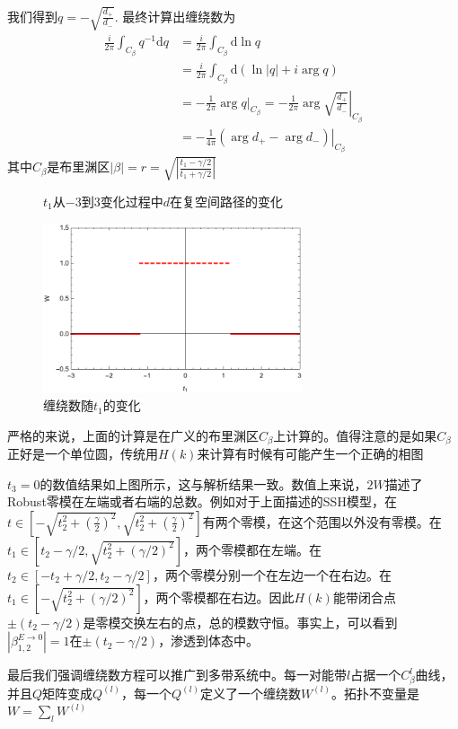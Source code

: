 \documentclass{article}
\begin{document}
我们得到$q=-\sqrt{\frac{d_+}{d_-}}$. 最终计算出缠绕数为
\begin{equation}
    \begin{split}
        \frac{i}{2\pi}\int_{C_\beta}q^{-1}\mathrm{d}q&=\frac{i}{2\pi}\int_{C_\beta}\mathrm{d}\ln q\\
        &=\frac{i}{2\pi}\int_{C_\beta}\mathrm{d}\left(\ln |q|+i\arg q\right)\\
        &=-\frac{1}{2\pi}\arg q|_{C_\beta}=\left.-\frac{1}{2\pi}\arg\sqrt{\frac{d_+}{d_-}}\right|_{C_\beta}\\
        &=\left.-\frac{1}{4\pi}(\arg d_+-\arg d_-)\right|_{C_\beta}
    \end{split}
\end{equation}
其中$C_\beta$是布里渊区$|\beta|=r=\sqrt{|\frac{t_1-\gamma/2}{t_1+\gamma/2}|}$
\begin{figure}[h]
    \centering
    \caption{$t_1$从$-3$到$3$变化过程中$d$在复空间路径的变化}
\end{figure}
\begin{figure}[h]
    \centering
    \includegraphics[width=3in]{windingnumber.pdf}
    \caption{缠绕数随$t_1$的变化}
\end{figure}
严格的来说，上面的计算是在广义的布里渊区$C_\beta$上计算的。值得注意的是如果$C_\beta$正好是一个单位圆，传统用$H(k)$来计算有时候有可能产生一个正确的相图

$t_3=0$的数值结果如上图所示，这与解析结果一致。数值上来说，$2W$描述了Robust零模在左端或者右端的总数。例如对于上面描述的SSH模型，在$t\in[-\sqrt{t_2^2+(\frac{\gamma}{2})^2},\sqrt{t_2^2+(\frac{\gamma}{2})^2}]$有两个零模，在这个范围以外没有零模。在$t_1\in[t_2-\gamma/2,\sqrt{t_2^2+(\gamma/2)^2}]$，两个零模都在左端。在$t_2\in[-t_2+\gamma/2,t_2-\gamma/2]$，两个零模分别一个在左边一个在右边。在$t_1\in[-\sqrt{t_2^2+(\gamma/2)^2}]$，两个零模都在右边。因此$H(k)$能带闭合点$\pm(t_2-\gamma/2)$是零模交换左右的点，总的模数守恒。事实上，可以看到$|\beta_{1,2}^{E\to0}|=1$在$\pm(t_2-\gamma/2)$，渗透到体态中。

最后我们强调缠绕数方程可以推广到多带系统中。每一对能带$l$占据一个$C_{\beta}^{l}$曲线，并且$Q$矩阵变成$Q^{(l)}$，每一个$Q^{(l)}$定义了一个缠绕数$W^{(l)}$。拓扑不变量是$W=\sum_lW^{(l)}$
\end{document}
